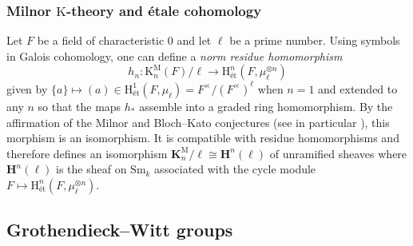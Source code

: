 \documentclass[11pt,leqno]{amsart}
\renewcommand{\1}{{\rm 1\hspace*{-0.4ex}%
\rule{0.1ex}{1.52ex}\hspace*{0.2ex}}}
\newcommand{\et}{\text{\'et}}
\newcommand{\Sm}{\mathrm{Sm}}
\newcommand{\Hr}{{\mathrm {H}}}
\newcommand{\<}[1]{{\langle}#1 {\rangle}}
\newcommand{\Kr}{\mathrm{K}}
\newcommand{\Kbf}{\mathbf{K}}
\newcommand{\Mr}{\mathrm{M}}
\newcommand{\Hbf}{\mathbf{H}}
\theoremstyle{plain}
\theoremstyle{definition}
\theoremstyle{remark}
\numberwithin{equation}{section}
\begin{document}
\subsubsection*{Milnor $\Kr$-theory and étale cohomology}

Let $F$ be a field of characteristic $0$ and let $\ell$ be a prime number. Using symbols in Galois cohomology, one can define a \emph{norm residue homomorphism} \[h_n:\Kr_n^\Mr(F)/\ell\rightarrow\Hr_\et^n(F,\mu_\ell^{\otimes n})\] given by $\{a\}\mapsto(a)\in\Hr_\et^1(F,\mu_\ell)=F^\times/(F^\times)^\ell$ when $n=1$ and extended to any $n$ so that the maps $h_*$ assemble into a graded ring homomorphism. By the affirmation of the Milnor and Bloch--Kato conjectures (see in particular \cite{voevodskyMotivicCohomology2coefficients2003,haesemeyerNormResidueTheorem2019}), this morphism is an isomorphism. It is compatible with residue homomorphisms and therefore defines an isomorphism $\Kbf_n^\Mr/\ell\cong\Hbf^n(\ell)$ of unramified sheaves where $\Hbf^n(\ell)$ is the sheaf on $\Sm_k$ associated with the cycle module $F\mapsto\Hr_\et^n(F,\mu_\ell^{\otimes n})$.

\subsection{Grothendieck--Witt groups}
\end{document}
